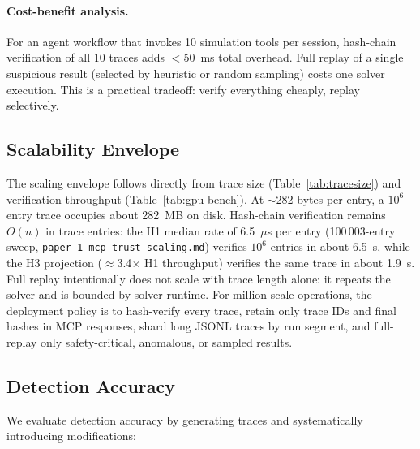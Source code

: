 \documentclass[letterpaper,twocolumn,10pt]{article}
\begin{document}
\paragraph{Cost-benefit analysis.} For an agent workflow that invokes 10
simulation tools per session, hash-chain verification of all 10 traces adds
$<$50~ms total overhead. Full replay of a single suspicious result (selected
by heuristic or random sampling) costs one solver execution. This is a
practical tradeoff: verify everything cheaply, replay selectively.

\subsection{Scalability Envelope}
\label{sec:eval-scalability}

The scaling envelope follows directly from trace size
(Table~\ref{tab:tracesize}) and verification throughput
(Table~\ref{tab:gpu-bench}). At $\sim$282 bytes per entry, a $10^6$-entry
trace occupies about 282~MB on disk. Hash-chain verification remains $O(n)$ in
trace entries: the H1 median rate of 6.5~$\mu$s per entry (100\,003-entry
sweep, \texttt{paper-1-mcp-trust-scaling.md}) verifies $10^6$ entries in about
6.5~s, while the H3 projection ($\approx$3.4$\times$ H1 throughput) verifies
the same trace in about 1.9~s. Full replay intentionally does not scale with
trace length alone: it repeats the solver and is bounded by solver runtime.
For million-scale operations, the deployment policy is to hash-verify every
trace, retain only
trace IDs and final hashes in MCP responses, shard long JSONL traces by run
segment, and full-replay only safety-critical, anomalous, or sampled results.

\subsection{Detection Accuracy}
\label{sec:eval-accuracy}

We evaluate detection accuracy by generating traces and systematically
introducing modifications:
\end{document}
